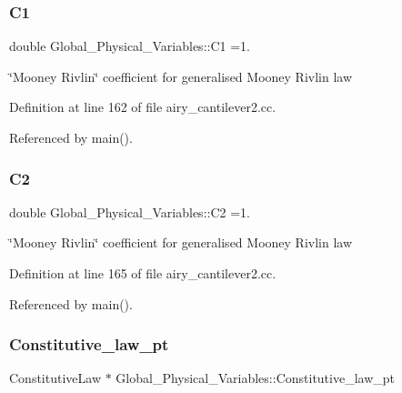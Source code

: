 \subsubsection{\texorpdfstring{C1}{C1}}
{\footnotesize\ttfamily double Global\+\_\+\+Physical\+\_\+\+Variables\+::\+C1 =1.}



\char`\"{}\+Mooney Rivlin\char`\"{} coefficient for generalised Mooney Rivlin law 



Definition at line 162 of file airy\+\_\+cantilever2.\+cc.



Referenced by main().

\mbox{\label{namespaceGlobal__Physical__Variables_af9defd1b5745cce50d2c386b3ac0e0ae}} 
\subsubsection{\texorpdfstring{C2}{C2}}
{\footnotesize\ttfamily double Global\+\_\+\+Physical\+\_\+\+Variables\+::\+C2 =1.}



\char`\"{}\+Mooney Rivlin\char`\"{} coefficient for generalised Mooney Rivlin law 



Definition at line 165 of file airy\+\_\+cantilever2.\+cc.



Referenced by main().

\mbox{\label{namespaceGlobal__Physical__Variables_a5d5f19442938130d36ee7476ae25049c}} 
\subsubsection{\texorpdfstring{Constitutive\+\_\+law\+\_\+pt}{Constitutive\_law\_pt}}
{\footnotesize\ttfamily Constitutive\+Law $\ast$ Global\+\_\+\+Physical\+\_\+\+Variables\+::\+Constitutive\+\_\+law\+\_\+pt}



